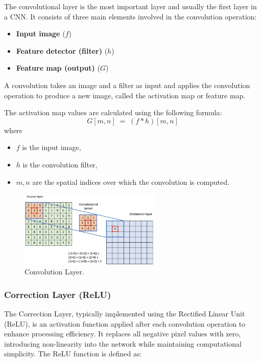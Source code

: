 The convolutional layer is the most important layer and usually the first layer in a CNN. It consists of three main elements involved in the convolution operation:
\begin{itemize}
  \item \textbf{Input image} ($f$)
  \item \textbf{Feature detector (filter)} ($h$)
  \item \textbf{Feature map (output)} ($G$)
\end{itemize}

A convolution takes an image and a filter as input and applies the convolution operation to produce a new image, called the activation map or feature map.

The activation map values are calculated using the following formula:
\begin{equation}
  G[m,n] \;=\; (f * h)[m,n]
\end{equation}
where
\begin{itemize}
  \item $f$ is the input image,
  \item $h$ is the convolution filter,
  \item $m,n$ are the spatial indices over which the convolution is computed.

\end{itemize}
\begin{figure}[H]
  \centering
  \includegraphics[width=0.6\textwidth]{Images/Chapter1/conv.png}
  \caption{Convolution Layer.}
  \label{fig:conv}
\end{figure}

\subsubsection{Correction Layer (ReLU)}

The Correction Layer, typically implemented using the Rectified Linear Unit (ReLU), is an activation function applied after each convolution operation to enhance processing efficiency. It replaces all negative pixel values with zero, introducing non-linearity into the network while maintaining computational simplicity. The ReLU function is defined as:


